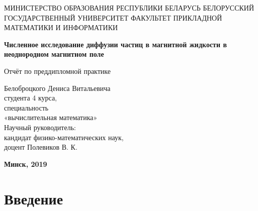 \documentclass[12pt]{article}
\begin{document}
    \begin{titlepage}

        \large
        \begin{center}
            МИНИСТЕРСТВО ОБРАЗОВАНИЯ РЕСПУБЛИКИ БЕЛАРУСЬ  БЕЛОРУССКИЙ ГОСУДАРСТВЕННЫЙ УНИВЕРСИТЕТ
            ФАКУЛЬТЕТ ПРИКЛАДНОЙ МАТЕМАТИКИ И ИНФОРМАТИКИ
        \end{center}

        \vspace{1cm}

        \large
        \begin{center}
            \textbf{Численное исследование диффузии частиц в магнитной жидкости в неоднородном магнитном поле}
        \end{center}

        \vspace{1cm}

        \begin{center}
            Отчёт по преддипломной практике
        \end{center}

        \vfill

        \begin{flushright}

            Белоброцкого Дениса Витальевича\\
            студента 4 курса,\\
            специальность\\
            «вычислительная математика»\\
            Научный руководитель:\\
            кандидат физико-математических наук,\\
            доцент Полевиков В. К.\\

        \end{flushright}

        \vspace{1cm}

        \large
        \begin{center}
            \textbf{Минск, 2019}
        \end{center}

    \end{titlepage}

\newpage

\tableofcontents

\newpage

\section{Введение}
\end{document}
